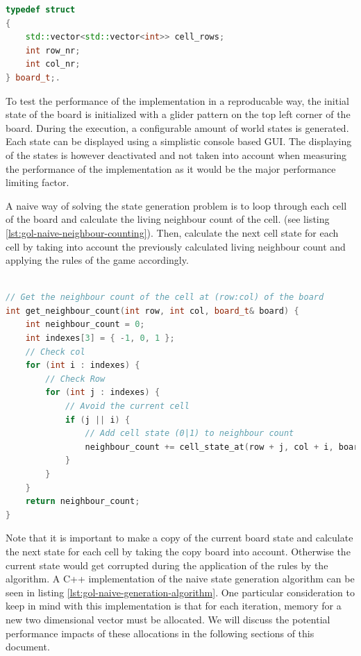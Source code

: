 \documentclass[a4paper,english,12pt,twoside=false]{scrartcl} %
\begin{document}
\begin{lstlisting}[caption={Game of Life Board Datastructure},label={lst:gol-naive-board-datastructure},language=C++]
typedef struct
{
    std::vector<std::vector<int>> cell_rows;
    int row_nr;
    int col_nr;
} board_t;.
\end{lstlisting}

To test the performance of the implementation in a reproducable way, the initial state of the board is initialized with a glider pattern on the top left corner of the board. During the execution, a configurable amount of world states is generated. Each state can be displayed using a simplistic console based GUI. The displaying of the states is however deactivated and not taken into account when measuring the performance of the implementation as it would be the major performance limiting factor. \newline

A naive way of solving the state generation problem is to loop through each cell of the board and calculate the living neighbour count of the cell. (see listing \ref{lst:gol-naive-neighbour-counting}). Then, calculate the next cell state for each cell by taking into account the previously calculated living neighbour count and applying the rules of the game accordingly. 

\begin{lstlisting}[caption={Naive Neighbour Counting},label={lst:gol-naive-neighbour-counting},language=C++]

// Get the neighbour count of the cell at (row:col) of the board
int get_neighbour_count(int row, int col, board_t& board) {
    int neighbour_count = 0;
    int indexes[3] = { -1, 0, 1 };
    // Check col
    for (int i : indexes) {
        // Check Row
        for (int j : indexes) {
            // Avoid the current cell
            if (j || i) {
                // Add cell state (0|1) to neighbour count
                neighbour_count += cell_state_at(row + j, col + i, board);
            }
        }
    }
    return neighbour_count;
}

\end{lstlisting}

Note that it is important to make a copy of the current board state and calculate the next state for each cell by taking the copy board into account. Otherwise the current state would get corrupted during the application of the rules by the algorithm. A C++ implementation of the naive state generation algorithm can be seen in listing \ref{lst:gol-naive-generation-algorithm}. One particular consideration to keep in mind with this implementation is that for each iteration, memory for a new two dimensional vector must be allocated. We will discuss the potential performance impacts of these allocations in the following sections of this document.
\end{document}

